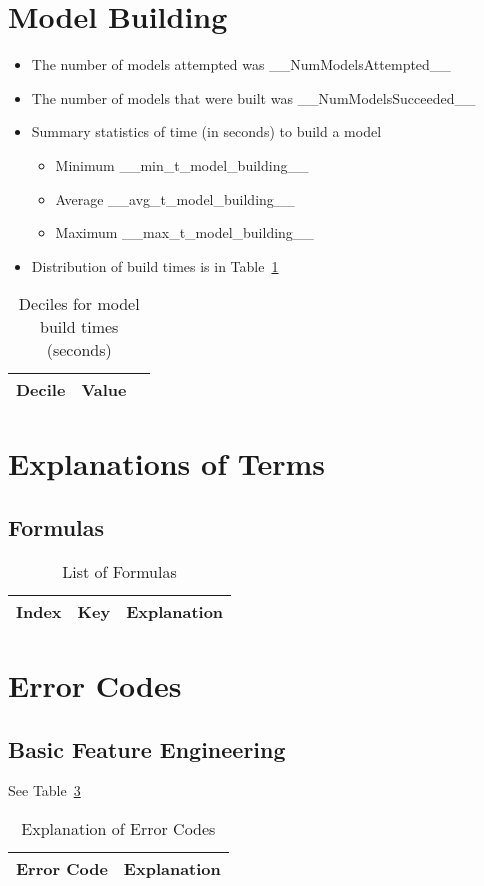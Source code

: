 \documentclass[letterpaper,12pt]{article}
\newcommand{\bi}{\begin{itemize}}
\newcommand{\ei}{\end{itemize}}
\newcommand{\NumModelsAttempted}{__NumModelsAttempted__}
\newcommand{\NumModelsSucceeded}{__NumModelsSucceeded__}
\newcommand{\ModelMinTime}{__min_t_model_building__}
\newcommand{\ModelMaxTime}{__max_t_model_building__}
\newcommand{\ModelAvgTime}{__avg_t_model_building__}
\begin{document}
\section{Model Building}
\bi
\item The number of models attempted was \NumModelsAttempted
\item The number of models that were built was \NumModelsSucceeded
\item Summary statistics of time (in seconds) to build a model
  \bi
\item Minimum \ModelMinTime
\item Average \ModelAvgTime
\item Maximum \ModelMaxTime
\ei
\item Distribution of build times is in Table~\ref{tbl_model_build_times}
\ei
\begin{table}
  \centering
  \begin{tabular}{|l|l|l|} \hline \hline
    {\bf Decile} & {\bf Value}  \\ \hline
     
    \hline
  \end{tabular}
  \caption{Deciles for model build times (seconds)}
  \label{tbl_model_build_times}
\end{table}

\section{Explanations of Terms}
\subsection{Formulas}

\begin{table}
  \centering
  \begin{tabular}{|l|l|l|} \hline \hline
    {\bf Index} & {\bf Key} & {\bf Explanation} \\ \hline 
     
    \hline
  \end{tabular}
  \caption{List of Formulas}
  \label{tbl_formulas}
\end{table}

\section{Error Codes}

\subsection{Basic Feature Engineering}
See Table~\ref{explanation_plp1_errs}
\begin{table}
  \centering
  \begin{tabular}{|l|l|} \hline \hline
    {\bf Error Code} & {\bf Explanation} \\ \hline  \hline
    
    \hline
  \end{tabular}
  \label{explanation_plp1_errs}
  \caption{Explanation of Error Codes}
\end{table}
\end{document}
